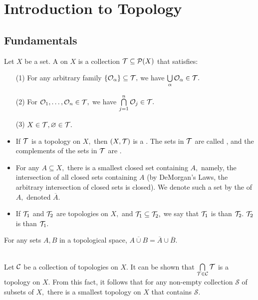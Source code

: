 \chapter{Introduction to Topology}
\section{Fundamentals}
\begin{defn}
Let $X$ be a set. A  on $X$ is a collection $\mathcal{T}\subseteq\mathcal{P}(X)$ that satisfies:
\begin{enumerate}
\item[(1)] For any arbitrary family $\{\mathcal{O}_{\alpha}\}\subseteq\mathcal{T},$ we have $\bigcup\limits_{\alpha}\mathcal{O}_{\alpha} \in\mathcal{T}.$
\item[(2)] For $\mathcal{O}_1,\hdots,\mathcal{O}_n\in\mathcal{T},$ we have $\bigcap\limits_{j=1}^n \mathcal{O}_j\in\mathcal{T}.$
\item[(3)] $X\in\mathcal{T}, \varnothing\in\mathcal{T}.$
\end{enumerate}
\end{defn}

\begin{defn}
\begin{itemize}
\item If $\mathcal{T}$ is a topology on $X,$ then $(X,\mathcal{T})$ is a . The sets in $\mathcal{T}$ are called , and the complements of the sets in $\mathcal{T}$ are .
\item For any $A\subseteq X,$ there is a smallest closed set containing $A,$ namely, the intersection of all closed sets containing $A$ (by DeMorgan's Laws, the arbitrary intersection of closed sets is closed). We denote such a set by the  of $A,$ denoted $\overline{A}.$
\item If $\mathcal{T}_1$ and $\mathcal{T}_2$ are topologies on $X,$ and $\mathcal{T}_1\subseteq\mathcal{T}_2,$ we say that $\mathcal{T}_1$ is  than $\mathcal{T}_2.$ $\mathcal{T}_2$ is  than $\mathcal{T}_1.$
\end{itemize}
\end{defn}

\begin{prop}
For any sets $A,B$ in a topological space, $\overline{A\cup B}=\overline{A}\cup\overline{B}.$ \\ \\
\end{prop}

\noindent Let $\mathcal{C}$ be a collection of topologies on $X.$ It can be shown that $\bigcap\limits_{\mathcal{T}\in\mathcal{C}}\mathcal{T}$ is a topology on $X.$ From this fact, it follows that for any non-empty collection $\mathcal{S}$ of subsets of $X,$ there is a smallest topology on $X$ that contains $\mathcal{S}.$

